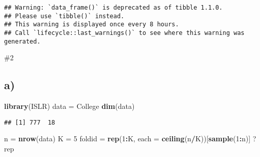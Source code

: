 \documentclass[
]{article}
\newenvironment{Shaded}{\begin{snugshade}}{\end{snugshade}}
\newcommand{\CommentTok}[1]{\textcolor[rgb]{0.56,0.35,0.01}{\textit{#1}}}
\newcommand{\DataTypeTok}[1]{\textcolor[rgb]{0.13,0.29,0.53}{#1}}
\newcommand{\DecValTok}[1]{\textcolor[rgb]{0.00,0.00,0.81}{#1}}
\newcommand{\KeywordTok}[1]{\textcolor[rgb]{0.13,0.29,0.53}{\textbf{#1}}}
\newcommand{\NormalTok}[1]{#1}
\newcommand{\OperatorTok}[1]{\textcolor[rgb]{0.81,0.36,0.00}{\textbf{#1}}}
\newcommand{\StringTok}[1]{\textcolor[rgb]{0.31,0.60,0.02}{#1}}
\begin{document}
\begin{verbatim}
## Warning: `data_frame()` is deprecated as of tibble 1.1.0.
## Please use `tibble()` instead.
## This warning is displayed once every 8 hours.
## Call `lifecycle::last_warnings()` to see where this warning was generated.
\end{verbatim}

\begin{Shaded}
\end{Shaded}

\#2

\hypertarget{a}{%
\subsection{a)}\label{a}}

\begin{Shaded}
\begin{Highlighting}[]
\KeywordTok{library}\NormalTok{(ISLR)}
\NormalTok{data =}\StringTok{ }\NormalTok{College}
\KeywordTok{dim}\NormalTok{(data)}
\end{Highlighting}
\end{Shaded}

\begin{verbatim}
## [1] 777  18
\end{verbatim}

\begin{Shaded}
\begin{Highlighting}[]
\NormalTok{n =}\StringTok{ }\KeywordTok{nrow}\NormalTok{(data)}
\NormalTok{K =}\StringTok{ }\DecValTok{5}
\NormalTok{foldid =}\StringTok{ }\KeywordTok{rep}\NormalTok{(}\DecValTok{1}\OperatorTok{:}\NormalTok{K, }\DataTypeTok{each =} \KeywordTok{ceiling}\NormalTok{(n}\OperatorTok{/}\NormalTok{K))[}\KeywordTok{sample}\NormalTok{(}\DecValTok{1}\OperatorTok{:}\NormalTok{n)]}
\NormalTok{?rep}
\end{Highlighting}
\end{Shaded}
\end{document}

